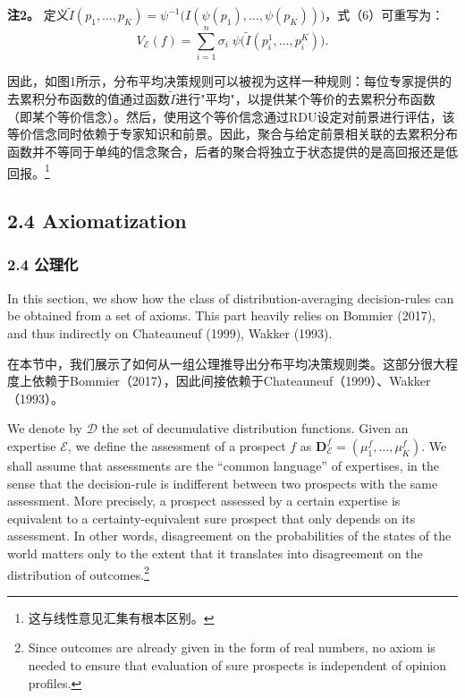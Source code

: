 \documentclass[12pt,a4paper]{article}
\newenvironment{original}
  {\par\noindent\ignorespaces}
  {\par}
\newenvironment{translation}
  {\par\noindent{\color{transblue}\ignorespaces}}
  {\par\medskip}
\begin{document}
\begin{translation}
\textbf{注2。} 定义$\tilde{I}(p_{1}, \dots, p_{K}) = \psi^{-1}\!\big(I(\psi(p_{1}), \dots, \psi(p_{K}))\big)$，式（6）可重写为：
\[
V_{\mathcal{E}}(f) = \sum_{i=1}^{n} \sigma_{i} \; \psi\!\big(\tilde{I}(p^{1}_{i}, \dots, p^{K}_{i})\big). \tag{7}
\]

因此，如图1所示，分布平均决策规则可以被视为这样一种规则：每位专家提供的去累积分布函数的值通过函数$\tilde{I}$进行"平均"，以提供某个等价的去累积分布函数（即某个等价信念）。然后，使用这个等价信念通过RDU设定对前景进行评估，该等价信念同时依赖于专家知识和前景。因此，聚合与给定前景相关联的去累积分布函数并不等同于单纯的信念聚合，后者的聚合将独立于状态提供的是高回报还是低回报。\footnote{这与线性意见汇集有根本区别。}
\end{translation}

\subsection{2.4 Axiomatization}
{\color{transblue}\subsubsection*{2.4 公理化}}

\begin{original}
In this section, we show how the class of distribution-averaging decision-rules can be obtained from a set of axioms. This part heavily relies on Bommier (2017), and thus indirectly on Chateauneuf (1999), Wakker (1993).
\end{original}

\begin{translation}
在本节中，我们展示了如何从一组公理推导出分布平均决策规则类。这部分很大程度上依赖于Bommier（2017），因此间接依赖于Chateauneuf（1999）、Wakker（1993）。
\end{translation}

\begin{original}
We denote by $\mathcal{D}$ the set of decumulative distribution functions. Given an expertise $\mathcal{E}$, we define the assessment of a prospect $f$ as $\mathbf{D}_{\mathcal{E}}^{f} = (\mu_{1}^{f}, \dots, \mu_{K}^{f})$. We shall assume that assessments are the ``common language'' of expertises, in the sense that the decision-rule is indifferent between two prospects with the same assessment. More precisely, a prospect assessed by a certain expertise is equivalent to a certainty-equivalent sure prospect that only depends on its assessment. In other words, disagreement on the probabilities of the states of the world matters only to the extent that it translates into disagreement on the distribution of outcomes.\footnote{Since outcomes are already given in the form of real numbers, no axiom is needed to ensure that evaluation of sure prospects is independent of opinion profiles.}
\end{original}
\end{document}
